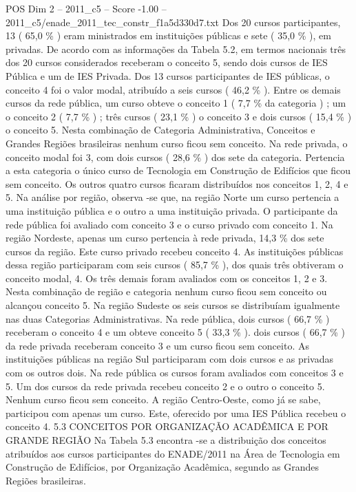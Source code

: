 \begin{textsample}{POS Dim 2 – 2011\_c5 – Score -1.00 – 2011\_c5/enade\_2011\_tec\_constr\_f1a5d330d7.txt}
Dos 20 cursos participantes, 13 ( 65,0 \% ) eram ministrados em instituições públicas e sete ( 35,0 \% ), em privadas.
De acordo com as informações da Tabela 5.2, em termos nacionais três dos 20 cursos considerados receberam o conceito 5, sendo dois cursos de IES Pública e um de IES Privada.
Dos 13 cursos participantes de IES públicas, o conceito 4 foi o valor modal, atribuído a seis cursos ( 46,2 \% ).
Entre os demais cursos da rede pública, um curso obteve o conceito 1 ( 7,7 \% da categoria ) ; um o conceito 2 ( 7,7 \% ) ; três cursos ( 23,1 \% ) o conceito 3 e dois cursos ( 15,4 \% ) o conceito 5.
Nesta combinação de Categoria Administrativa, Conceitos e Grandes Regiões brasileiras nenhum curso ficou sem conceito.
Na rede privada, o conceito modal foi 3, com dois cursos ( 28,6 \% ) dos sete da categoria.
Pertencia a esta categoria o único curso de Tecnologia em Construção de Edifícios que ficou sem conceito.
Os outros quatro cursos ficaram distribuídos nos conceitos 1, 2, 4 e 5.
Na análise por região, observa -se que, na região Norte um curso pertencia a uma instituição pública e o outro a uma instituição privada.
O participante da rede pública foi avaliado com conceito 3 e o curso privado com conceito 1.
Na região Nordeste, apenas um curso pertencia à rede privada, 14,3 \% dos sete cursos da região.
Este curso privado recebeu conceito 4.
As instituições públicas dessa região participaram com seis cursos ( 85,7 \% ), dos quais três obtiveram o conceito modal, 4.
Os três demais foram avaliados com os conceitos 1, 2 e 3.
Nesta combinação de região e categoria nenhum curso ficou sem conceito ou alcançou conceito 5.
Na região Sudeste os seis cursos se distribuíam igualmente nas duas Categorias Administrativas.
Na rede pública, dois cursos ( 66,7 \% ) receberam o conceito 4 e um obteve conceito 5 ( 33,3 \% ). dois cursos ( 66,7 \% ) da rede privada receberam conceito 3 e um curso ficou sem conceito.
As instituições públicas na região Sul participaram com dois cursos e as privadas com os outros dois.
Na rede pública os cursos foram avaliados com conceitos 3 e 5.
Um dos cursos da rede privada recebeu conceito 2 e o outro o conceito 5.
Nenhum curso ficou sem conceito.
A região Centro-Oeste, como já se sabe, participou com apenas um curso.
Este, oferecido por uma IES Pública recebeu o conceito 4. 5.3 CONCEITOS POR ORGANIZAÇÃO ACADÊMICA E POR GRANDE REGIÃO Na Tabela 5.3 encontra -se a distribuição dos conceitos atribuídos aos cursos participantes do ENADE/2011 na Área de Tecnologia em Construção de Edifícios, por Organização Acadêmica, segundo as Grandes Regiões brasileiras.

\end{textsample}
